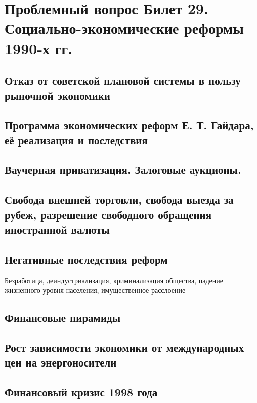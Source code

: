 \section{\textbf{Проблемный вопрос} Билет 29. Социально-экономические реформы 1990-х гг.}
\subsection{Отказ от советской плановой системы в пользу рыночной экономики}
\subsection{Программа экономических реформ Е. Т. Гайдара, её реализация и последствия}
\subsection{Ваучерная приватизация. Залоговые аукционы.}
\subsection{Свобода внешней торговли, свобода выезда за рубеж, разрешение свободного обращения иностранной валюты}
\subsection{Негативные последствия реформ}
Безработица, деиндустриализация, криминализация общества, падение жизненного уровня населения, имущественное расслоение
\subsection{Финансовые пирамиды}
\subsection{Рост зависимости экономики от международных цен на энергоносители}
\subsection{Финансовый кризис 1998 года}